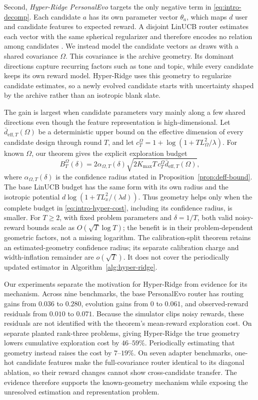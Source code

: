 \documentclass{article} %
\begin{document}
Second, \emph{Hyper-Ridge PersonalEvo} targets the only negative term in \eqref{eq:intro-decomp}. Each candidate $a$ has its own parameter vector $\theta_a$, which maps $d$ user and candidate features to expected reward. A disjoint LinUCB router estimates each vector with the same spherical regularizer and therefore encodes no relation among candidates \citep{abbasi2011oful,chu2011linucb}. We instead model the candidate vectors as draws with a shared covariance $\Omega$. This covariance is the archive geometry. Its dominant directions capture recurring factors such as tone and topic, while every candidate keeps its own reward model. Hyper-Ridge uses this geometry to regularize candidate estimates, so a newly evolved candidate starts with uncertainty shaped by the archive rather than an isotropic blank slate.

The gain is largest when candidate parameters vary mainly along a few shared directions even though the feature representation is high-dimensional. Let $\bar d_{\mathrm{eff},T}(\Omega)$ be a deterministic upper bound on the effective dimension of every candidate design through round $T$, and let $c_T^\Omega=1+\log(1+TL_\Omega^2/\lambda)$. For known $\Omega$, our theorem gives the explicit exploration budget
\begin{equation}
\label{eq:intro-hyper-cost}
B_T^\Omega(\delta)
=
2\alpha_{\Omega,T}(\delta)
\sqrt{2K_{\max}T\,c_T^\Omega\bar d_{\mathrm{eff},T}(\Omega)},
\end{equation}
where $\alpha_{\Omega,T}(\delta)$ is the confidence radius stated in Proposition~\ref{prop:deff-bound}. The base LinUCB budget has the same form with its own radius and the isotropic potential $d\log(1+TL_x^2/(\lambda d))$. Thus geometry helps only when the complete budget in \eqref{eq:intro-hyper-cost}, including its confidence radius, is smaller. For $T\ge2$, with fixed problem parameters and $\delta=1/T$, both valid noisy-reward bounds scale as $O(\sqrt{T}\log T)$; the benefit is in their problem-dependent geometric factors, not a missing logarithm. The calibration-split theorem retains an estimated-geometry confidence radius; its separate calibration charge and width-inflation remainder are $o(\sqrt{T})$. It does not cover the periodically updated estimator in Algorithm~\ref{alg:hyper-ridge}.

Our experiments separate the motivation for Hyper-Ridge from evidence for its mechanism. Across nine benchmarks, the base PersonalEvo router has routing gains from $0.036$ to $0.280$, evolution gains from $0$ to $0.061$, and observed-reward residuals from $0.010$ to $0.071$. Because the simulator clips noisy rewards, these residuals are not identified with the theorem's mean-reward exploration cost. On separate planted rank-three problems, giving Hyper-Ridge the true geometry lowers cumulative exploration cost by $46$--$59\%$. Periodically estimating that geometry instead raises the cost by $7$--$19\%$. On seven adapter benchmarks, one-hot candidate features make the full-covariance router identical to its diagonal ablation, so their reward changes cannot show cross-candidate transfer. The evidence therefore supports the known-geometry mechanism while exposing the unresolved estimation and representation problem.
\end{document}
